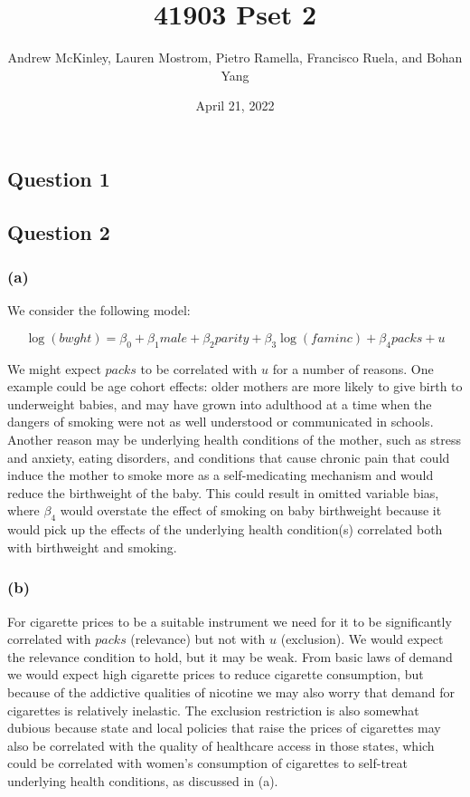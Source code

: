 \documentclass[
]{article}
\title{41903 Pset 2}
\author{Andrew McKinley, Lauren Mostrom, Pietro Ramella, Francisco
Ruela, and Bohan Yang}
\date{April 21, 2022}
\begin{document}
\maketitle

\hypertarget{question-1}{%
\subsection{Question 1}\label{question-1}}

\newpage

\hypertarget{question-2}{%
\subsection{Question 2}\label{question-2}}

\hypertarget{a}{%
\subsubsection{(a)}\label{a}}

We consider the following model:

\[ \log(bwght) = \beta_0 + \beta_1 male + \beta_2 parity + \beta_3 \log(faminc) + \beta_4 packs + u \]

We might expect \(packs\) to be correlated with \(u\) for a number of
reasons. One example could be age cohort effects: older mothers are more
likely to give birth to underweight babies, and may have grown into
adulthood at a time when the dangers of smoking were not as well
understood or communicated in schools. Another reason may be underlying
health conditions of the mother, such as stress and anxiety, eating
disorders, and conditions that cause chronic pain that could induce the
mother to smoke more as a self-medicating mechanism and would reduce the
birthweight of the baby. This could result in omitted variable bias,
where \(\beta_4\) would overstate the effect of smoking on baby
birthweight because it would pick up the effects of the underlying
health condition(s) correlated both with birthweight and smoking.

\hypertarget{b}{%
\subsubsection{(b)}\label{b}}

For cigarette prices to be a suitable instrument we need for it to be
significantly correlated with \(packs\) (relevance) but not with \(u\)
(exclusion). We would expect the relevance condition to hold, but it may
be weak. From basic laws of demand we would expect high cigarette prices
to reduce cigarette consumption, but because of the addictive qualities
of nicotine we may also worry that demand for cigarettes is relatively
inelastic. The exclusion restriction is also somewhat dubious because
state and local policies that raise the prices of cigarettes may also be
correlated with the quality of healthcare access in those states, which
could be correlated with women's consumption of cigarettes to self-treat
underlying health conditions, as discussed in (a).
\end{document}
